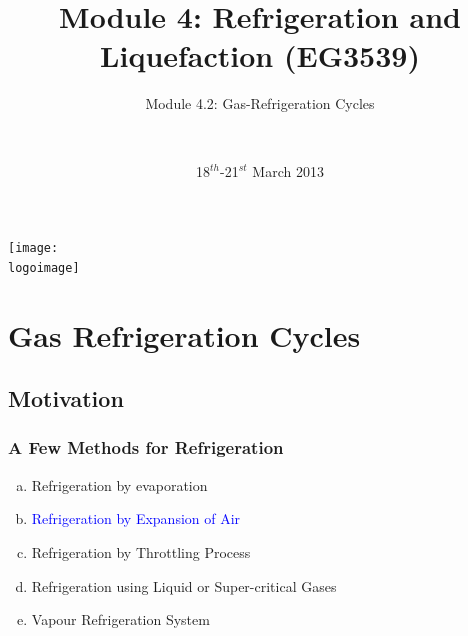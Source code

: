 \documentclass[10pt,compress]{beamer}
\institute{School of Engineering}
\title{Module 4: Refrigeration and Liquefaction (EG3539)}
\subtitle{Module 4.2: Gas-Refrigeration Cycles}
\date[18-21/03/2013]{18$^{th}$-21$^{st}$ March 2013}
\author[\shortname]{%
  \fullname\\\ttfamily{\emailaddress}
}
\newcommand{\logoimage}{../FigBanner/UoAHorizBanner}
\begin{document}
\begin{frame}
  \titlepage
  \vfill%
  \begin{center}
    \texttt{[image: \\logoimage]}
  \end{center}
\end{frame}






\section{Gas Refrigeration Cycles}

\subsection{Motivation}
\begin{frame}
 \frametitle{A Few Methods for Refrigeration}
  \begin{enumerate}[(a)]
   \item  Refrigeration by evaporation
   \item \textcolor{blue}{Refrigeration by Expansion of Air}
   \item  Refrigeration by Throttling Process
   \item  Refrigeration using Liquid or Super-critical Gases
   \item  Vapour Refrigeration System
  \end{enumerate}
\end{frame}
\end{document}
